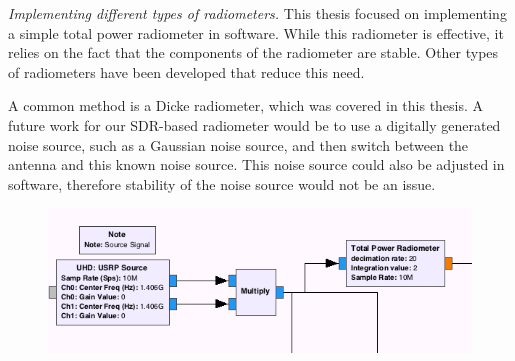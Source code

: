 \emph{Implementing different types of radiometers.}  
This thesis focused on implementing a simple total power radiometer in software.  While this radiometer is effective, it relies on the fact that the components of the radiometer are stable.  Other types of radiometers have been developed that reduce this need.  



A common method is a Dicke radiometer, which was covered in this thesis.  A future work for our SDR-based radiometer would be to use a digitally generated noise source, such as a Gaussian noise source, and then switch between the antenna and this known noise source.  This noise source could also be adjusted in software, therefore stability of the noise source would not be an issue.  



{\begin{figure}[h!tb] 
\centering
\includegraphics[width=14cm]{Images/N200_rad_corr.png}
\label{correlating_sdr}
\end{figure}
}

